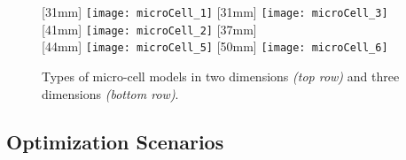 \begin{figure}
  [31mm]{%
    \texttt{[image: microCell\_1]}%
  }%
  \hfill%
  [31mm]{%
    \texttt{[image: microCell\_3]}%
  }%
  \hfill%
  [41mm]{%
    \texttt{[image: microCell\_2]}%
  }%
  \hfill%
  [37mm]{%
    \hspace*{-45mm}%
  }\\[2mm]%
  [44mm]{%
    \texttt{[image: microCell\_5]}%
  }%
  \qquad%
  [50mm]{%
    \texttt{[image: microCell\_6]}%
  }%
  \caption[Types of micro-cell models]{%
    Types of micro-cell models in two dimensions \emph{(top row)}
    and three dimensions \emph{(bottom row)}.%
  }%
  \label{fig:microCell}%
\end{figure}

\subsection{Optimization Scenarios}
\label{sec:632scenarios}

\dummytext[5]{}
